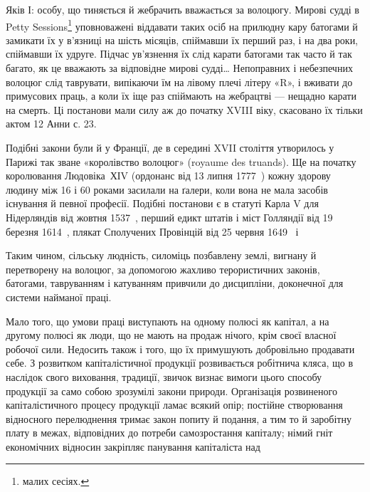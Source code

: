 Яків І: особу, що тиняється й жебрачить вважається за волоцюгу.
Мирові судді в Petty Sessions\footnote*{
малих сесіях. 
} уповноважені віддавати
таких осіб на прилюдну кару батогами й замикати їх у в’язниці
на шість місяців, спіймавши їх перший раз, і на два роки, спіймавши
їх удруге. Підчас ув’язнення їх слід карати батогами так часто
й так багато, як це вважають за відповідне мирові судді\dots{} Непоправних
і небезпечних волоцюг слід таврувати, випікаючи
їм на лівому плечі літеру «R», і вживати до примусових праць,
а коли їх іще раз спіймають на жебрацтві — нещадно карати
на смерть. Ці постанови мали силу аж до початку XVIII віку,
скасовано їх тільки актом 12 Анни с. 23.

Подібні закони були й у Франції, де в середині XVII століття
утворилось у Парижі так зване «королівство волоцюг»
(royaume des truands). Ще на початку королювання Людовіка~ХІV
(ордонанс від 13 липня 1777~) кожну здорову людину між 16 і
60 роками засилали на ґалери, коли вона не мала засобів існування
й певної професії. Подібні постанови є в статуті Карла V
для Нідерляндів від жовтня 1537~, перший едикт штатів і міст
Голляндії від 19 березня 1614~, плякат Сполучених Провінцій
від 25 червня 1649~ і~

Таким чином, сільську людність, силоміць позбавлену землі,
вигнану й перетворену на волоцюг, за допомогою жахливо терористичних
законів, батогами, тавруванням і катуванням привчили
до дисципліни, доконечної для системи найманої праці.

Мало того, що умови праці виступають на одному полюсі як
капітал, а на другому полюсі як люди, що не мають на продаж
нічого, крім своєї власної робочої сили. Недосить також і того,
що їх примушують добровільно продавати себе. З розвитком капіталістичної
продукції розвивається робітнича кляса, що в наслідок
свого виховання, традиції, звичок визнає вимоги цього способу
продукції за само собою зрозумілі закони природи. Організація
розвиненого капіталістичного процесу продукції ламає
всякий опір; постійне створювання відносного перелюднення
тримає закон попиту й подання, а тим то й заробітну плату
в межах, відповідних до потреби самозростання капіталу; німий
гніт економічних відносин закріпляє панування капіталіста над
\parbreak{}  %
